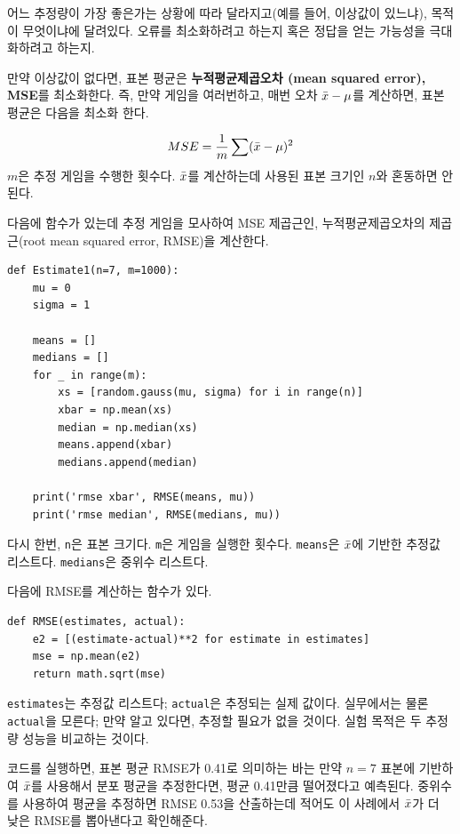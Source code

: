 어느 추정량이 가장 좋은가는 상황에 따라 달라지고(예를 들어, 이상값이 있느냐),
목적이 무엇이냐에 달려있다. 오류를 최소화하려고 하는지 혹은 정답을 얻는 가능성을 극대화하려고 하는지.


만약 이상값이 없다면, 표본 평균은 {\bf 누적평균제곱오차 (mean squared
error), MSE}를 최소화한다. 즉, 만약 게임을 여러번하고, 매번 오차 
$\bar{x} - \mu$를 계산하면, 표본 평균은 다음을 최소화 한다.

%
\[ MSE = \frac{1}{m} \sum (\bar{x} - \mu)^2 \]
%
$m$은 추정 게임을 수행한 횟수다. $\bar{x}$를 계산하는데 사용된 표본 크기인 $n$와 혼동하면 안된다.

다음에 함수가 있는데 추정 게임을 모사하여 MSE 제곱근인, 
누적평균제곱오차의 제곱근(root mean squared error, RMSE)을 계산한다.


\begin{verbatim}
def Estimate1(n=7, m=1000):
    mu = 0
    sigma = 1

    means = []
    medians = []
    for _ in range(m):
        xs = [random.gauss(mu, sigma) for i in range(n)]
        xbar = np.mean(xs)
        median = np.median(xs)
        means.append(xbar)
        medians.append(median)

    print('rmse xbar', RMSE(means, mu))
    print('rmse median', RMSE(medians, mu))
\end{verbatim}

다시 한번, {\tt n}은 표본 크기다. {\tt m}은 게임을 실행한 횟수다.
{\tt means}은 $\bar{x}$에 기반한 추정값 리스트다. 
{\tt medians}은 중위수 리스트다.

다음에 RMSE를 계산하는 함수가 있다.

\begin{verbatim}
def RMSE(estimates, actual):
    e2 = [(estimate-actual)**2 for estimate in estimates]
    mse = np.mean(e2)
    return math.sqrt(mse)
\end{verbatim}

{\tt estimates}는 추정값 리스트다; {\tt actual}은 추정되는 실제 값이다.
실무에서는 물론 {\tt actual}을 모른다; 만약 알고 있다면, 추정할 필요가 없을 것이다. 실험 목적은 두 추정량 성능을 비교하는 것이다.

코드를 실행하면, 표본 평균 RMSE가 0.41로 의미하는 바는 만약
$n=7$ 표본에 기반하여 $\bar{x}$를 사용해서 분포 평균을 추정한다면,
평균 0.41만큼 떨어졌다고 예측된다. 중위수를 사용하여 평균을 추정하면 RMSE 0.53을 산출하는데 적어도 이 사례에서 $\bar{x}$가 더 낮은 RMSE를 뽑아낸다고 확인해준다.

